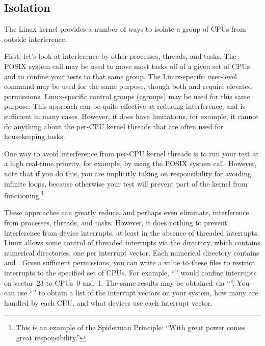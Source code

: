 \subsection{Isolation}
\label{sec:debugging:Isolation}

The Linux kernel provides a number of ways to isolate a group of
CPUs from outside interference.

First, let's look at interference by other processes, threads, and tasks.
The POSIX  system call may be used to move
most tasks off of a given set of CPUs and to confine your tests to
that same group.
The Linux-specific user-level  command may be used for
the same purpose, though both  and
 require elevated permissions.
Linux-specific control groups (cgroups) may be used for this same purpose.
This approach can be quite effective at reducing interference, and
is sufficient in many cases.
However, it does have limitations, for example, it cannot do anything
about the per-CPU kernel threads that are often used for housekeeping
tasks.

One way to avoid interference from per-CPU kernel threads is to run
your test at a high real-time priority, for example, by using
the POSIX  system call.
However, note that if you do this, you are implicitly taking on
responsibility for avoiding infinite loops, because otherwise
your test will prevent part of the kernel from functioning.\footnote{
	This is an example of the Spiderman Principle: ``With great
	power comes great responsibility.''}

These approaches can greatly reduce, and perhaps even eliminate,
interference from processes, threads, and tasks.
However, it does nothing to prevent interference from device
interrupts, at least in the absence of threaded interrupts.
Linux allows some control of threaded interrupts via the
 directory, which contains numerical directories, one
per interrupt vector.
Each numerical directory contains  and
.
Given sufficient permissions, you can write a value to these files
to restrict interrupts to the specified set of CPUs.
For example, ``''
would confine interrupts on vector~23 to CPUs~0 and~1.
The same results may be obtained via
``''.
You can use ``'' to obtain a list of the interrupt
vectors on your system, how many are handled by each CPU, and what
devices use each interrupt vector.

